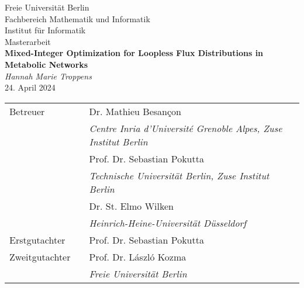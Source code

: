 \begin{titlepage}
\thispagestyle{empty}
\newcommand{\HRule}{\rule{\linewidth}{0.5mm}}
\hspace{1cm}
{
\center
{\LARGE Freie Universität Berlin}\\
{\Large Fachbereich Mathematik und Informatik}\\[0.4cm]
{\Large Institut für Informatik}\\[1.4cm]

{\huge Masterarbeit}\\[0.8cm]




{\huge \bfseries Mixed-Integer Optimization for Loopless Flux Distributions in Metabolic Networks}\\[1cm]
{\large \textit{Hannah Marie Troppens}}\\[1cm]
24. April 2024
\\[7cm]
}
 
\normalsize{%
\begin{tabular}{l@{}ll}
    Betreuer &  & Dr. Mathieu Besançon \\
    &  & \textit{Centre Inria d'Universit\'e Grenoble Alpes, Zuse Institut Berlin} \\
    &  & Prof. Dr. Sebastian Pokutta \\
    &  & \textit{Technische Universität Berlin, Zuse Institut Berlin} \\
    &  & Dr. St. Elmo Wilken\\
    &  & \textit{Heinrich-Heine-Universität Düsseldorf} \\
    Erstgutachter &  & Prof. Dr. Sebastian Pokutta \\
    Zweitgutachter &  & Prof. Dr. László Kozma\\
    &  & \textit{Freie Universität Berlin} \\
\end{tabular}
}

\end{titlepage}
\restoregeometry

